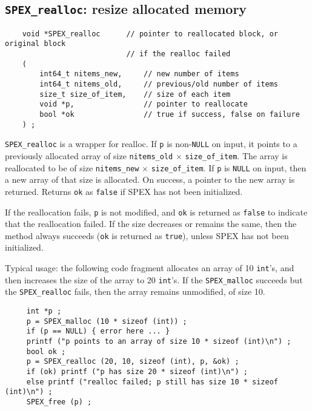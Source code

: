 \documentclass[12pt,oneside]{book}
\theoremstyle{definition}
\begin{document}
\subsection{\texttt{SPEX\_realloc}: resize allocated memory} \label{ss:SPEX_realloc}
\begin{mdframed}[userdefinedwidth=\textwidth]
{\footnotesize
\begin{verbatim}
    void *SPEX_realloc      // pointer to reallocated block, or original block
                            // if the realloc failed
    (
        int64_t nitems_new,     // new number of items
        int64_t nitems_old,     // previous/old number of items
        size_t size_of_item,    // size of each item
        void *p,                // pointer to reallocate
        bool *ok                // true if success, false on failure
    ) ;
\end{verbatim}
} \end{mdframed}

\verb|SPEX_realloc| is a wrapper for realloc.  If \verb|p| is non-\verb|NULL| on
input, it points to a previously allocated array of size \verb|nitems_old|
$\times$ \verb|size_of_item|.  The array is reallocated to be of size
\verb|nitems_new| $\times$ \verb|size_of_item|.  If \verb|p| is \verb|NULL| on input,
then a new array of that size is allocated.  On success, a pointer to the new
array is returned.  Returns \verb|ok| as \verb|false| if SPEX has not been
initialized.

If the reallocation fails, \verb|p| is not modified, and \verb|ok| is returned
as \verb|false| to indicate that the reallocation failed.  If the size
decreases or remains the same, then the method always succeeds (\verb|ok| is
returned as \verb|true|), unless SPEX has not been initialized.

Typical usage:  the following code fragment allocates an array of 10
\verb|int|'s, and then increases the size of the array to 20 \verb|int|'s.  If
the \verb|SPEX_malloc| succeeds but the \verb|SPEX_realloc| fails, then the
array remains unmodified, of size 10.

\begin{mdframed}[userdefinedwidth=\textwidth]
{\footnotesize
\begin{verbatim}
     int *p ;
     p = SPEX_malloc (10 * sizeof (int)) ;
     if (p == NULL) { error here ... }
     printf ("p points to an array of size 10 * sizeof (int)\n") ;
     bool ok ;
     p = SPEX_realloc (20, 10, sizeof (int), p, &ok) ;
     if (ok) printf ("p has size 20 * sizeof (int)\n") ;
     else printf ("realloc failed; p still has size 10 * sizeof (int)\n") ;
     SPEX_free (p) ;
\end{verbatim}
} \end{mdframed}
\end{document}

